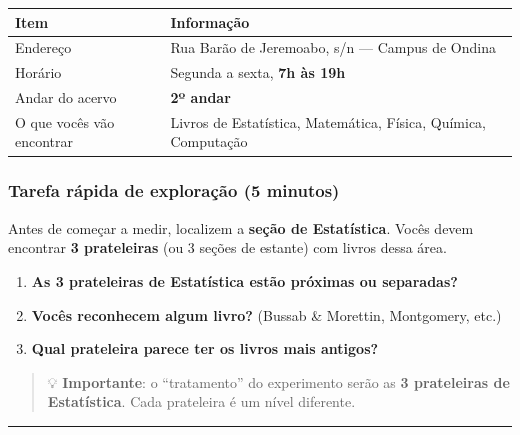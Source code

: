 \documentclass[
]{article}
\newcounter{none} %
\providecommand{\tightlist}{%
  \setlength{\itemsep}{0pt}\setlength{\parskip}{0pt}}
\begin{document}
{\def\LTcaptype{none} %
\begin{longtable}[]{@{}
  >{\raggedright\arraybackslash}p{}
  >{\raggedright\arraybackslash}p{}@{}}
\toprule\noalign{}
\begin{minipage}[b]{\linewidth}\raggedright
Item
\end{minipage} & \begin{minipage}[b]{\linewidth}\raggedright
Informação
\end{minipage} \\
\midrule\noalign{}
\endhead
\bottomrule\noalign{}
\endlastfoot
Endereço & Rua Barão de Jeremoabo, s/n --- Campus de Ondina \\
Horário & Segunda a sexta, \textbf{7h às 19h} \\
Andar do acervo & \textbf{2º andar} \\
O que vocês vão encontrar & Livros de Estatística, Matemática, Física,
Química, Computação \\
\end{longtable}
}

\subsubsection{Tarefa rápida de exploração (5
minutos)}\label{tarefa-ruxe1pida-de-explorauxe7uxe3o-5-minutos}

Antes de começar a medir, localizem a \textbf{seção de Estatística}.
Vocês devem encontrar \textbf{3 prateleiras} (ou 3 seções de estante)
com livros dessa área.

\begin{enumerate}
\def\labelenumi{\arabic{enumi}.}
\tightlist
\item
  \textbf{As 3 prateleiras de Estatística estão próximas ou separadas?}
\item
  \textbf{Vocês reconhecem algum livro?} (Bussab \& Morettin,
  Montgomery, etc.)
\item
  \textbf{Qual prateleira parece ter os livros mais antigos?}
\end{enumerate}

\begin{quote}
💡 \textbf{Importante}: o ``tratamento'' do experimento serão as
\textbf{3 prateleiras de Estatística}. Cada prateleira é um nível
diferente.
\end{quote}

\begin{center}\rule{0.5\linewidth}{0.5pt}\end{center}
\end{document}
